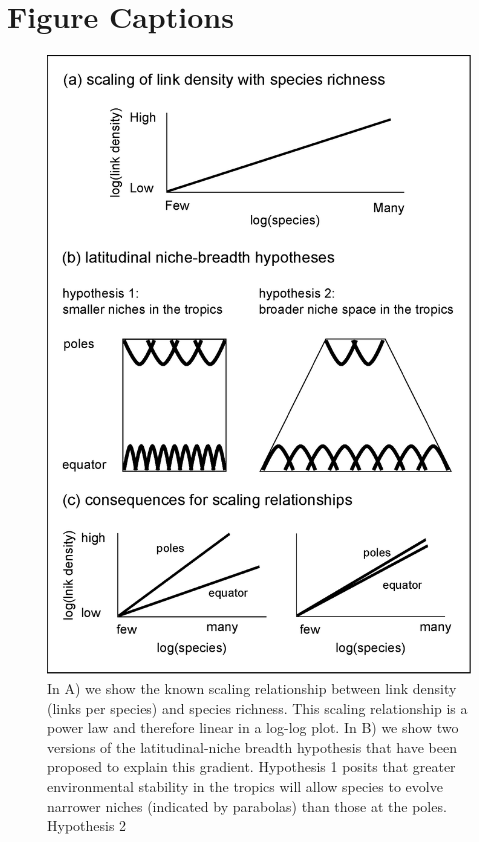 \documentclass[12pt]{article}
\begin{document}
\newpage

\section*{Figure Captions}

\begin{figure}[h]
\centerline{\includegraphics*[height=.5\textheight]{Figures/Other/conceptual_figure.eps}}
\caption{In A) we show the known scaling relationship between link density (links per species) and 
species richness. This scaling relationship is a power law and therefore linear in a log-log plot.
In B) we show two versions of the latitudinal-niche breadth hypothesis that have been proposed to
explain this gradient. Hypothesis 1 posits that greater environmental stability in the tropics will 
allow species to evolve narrower niches (indicated by parabolas) than those at the poles. Hypothesis 2 
}
\end{figure}
\end{document}
